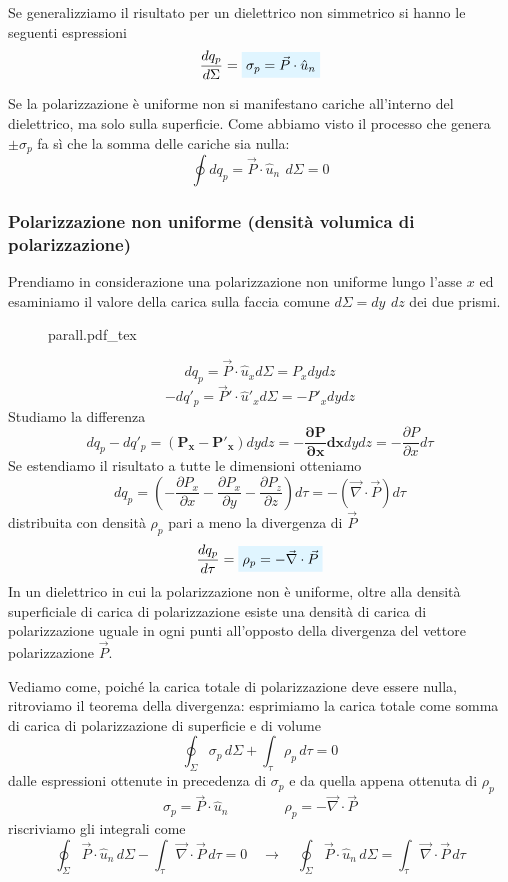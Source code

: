 \documentclass[x11names]{report}
\newcommand{\incfig}[1]{%
	{#1.pdf_tex}
}
\newcommand{\viola}[1]{%
	\colorbox{myblue}{$\displaystyle #1$}
}
\begin{document}
Se generalizziamo il risultato per un dielettrico non simmetrico si hanno le seguenti espressioni 
\begin{equation}
	\frac{dq_p}{d\Sigma} = \viola{\sigma_p = \vec{P} \cdot \hat{u}_n  }
\end{equation}



Se la polarizzazione è uniforme non si manifestano cariche all'interno del dielettrico, ma solo sulla superficie. Come abbiamo visto il processo che genera \(\pm \sigma_p\) fa sì che la somma delle cariche sia nulla:
\[
\oint dq_p =  \vec{P} \cdot \hat{u}_n \,\ d\Sigma = 0
\]

\subsubsection{Polarizzazione non uniforme (densità volumica di polarizzazione)}
Prendiamo in considerazione una polarizzazione non uniforme lungo l'asse \(x\)  ed esaminiamo il valore della carica sulla faccia comune \(d\Sigma = dy \,\ dz \) dei due prismi.

\begin{figure}[H]
	\centering
	\incfig{parall}
\end{figure}

\[
dq_p = \vec{P} \cdot \hat{u}_x d\Sigma = P_x dydz
\]
\[
-dq'_p = \vec{P}'\cdot \hat{u}'_x d\Sigma = -P'_x dydz
\]
Studiamo la differenza
\[
dq_p -dq'_p = \boldsymbol{(P_x - P'_x)}dydz = \boldsymbol{-\frac{\partial P}{\partial x} dx} dy dz = -\frac{\partial P}{\partial x}d\tau
\]
Se estendiamo il risultato a tutte le dimensioni otteniamo 
\[
dq_p = \left(-\frac{\partial P_x}{\partial x}-\frac{\partial P_x}{\partial y}-\frac{\partial P_z}{\partial z}\right)d\tau = -\left(\vec{\nabla}\cdot\vec{P}\right)d\tau
\]
distribuita con densità \(\rho_p\) pari a meno la divergenza di \(\vec{P}\)
\begin{equation}
	 \frac{dq_p}{d\tau} = \viola{\rho_p = -\vec{\nabla}\cdot\vec{P}}
\end{equation}
In un dielettrico in cui la polarizzazione non è uniforme, oltre alla densità superficiale di carica di polarizzazione esiste una densità di carica di polarizzazione uguale in ogni punti all'opposto della divergenza del vettore polarizzazione \(\vec{P}\).

Vediamo come, poiché la carica totale di polarizzazione deve essere nulla, ritroviamo il teorema della divergenza: esprimiamo la carica totale come somma di carica di polarizzazione di superficie e di volume
\[
\oint_\Sigma \sigma_p \, d\Sigma + \int_\tau \rho_p \, d\tau = 0
\]
dalle espressioni ottenute in precedenza di \(\sigma_p\) e da quella appena ottenuta di \(\rho_p\) 
\[
\sigma_p = \vec{P}\cdot\hat{u}_n \qquad \qquad \rho_p = - \vec{\nabla}\cdot\vec{P}
\]
riscriviamo gli integrali come
\[
\oint_\Sigma \vec{P}\cdot\hat{u}_n \, d\Sigma  - \int_\tau \vec{\nabla}\cdot\vec{P} \, d\tau = 0 \quad \to \quad \oint_\Sigma \vec{P}\cdot\hat{u}_n \, d\Sigma  = \int_\tau \vec{\nabla}\cdot\vec{P} \, d\tau
\]
\end{document}
